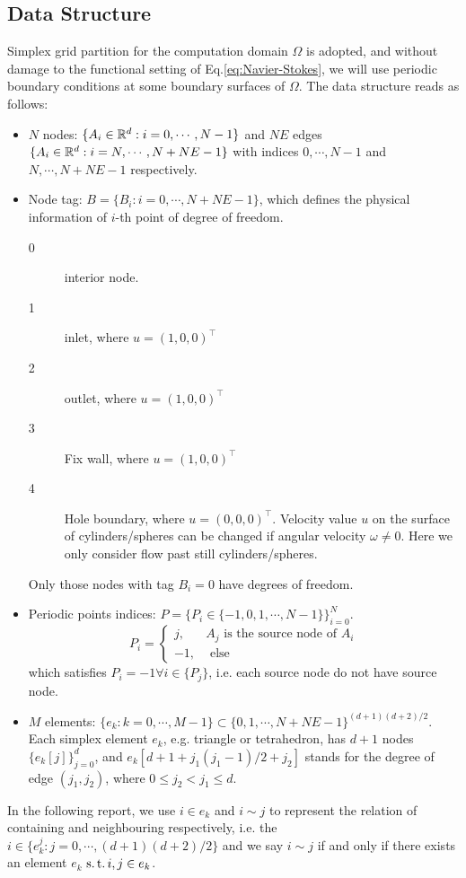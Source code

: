 \subsection{Data Structure}
Simplex grid partition for the computation domain $\Omega$ is adopted, 
and without damage to the functional setting of Eq.\eqref{eq:Navier-Stokes}, 
we will use periodic boundary conditions at some boundary surfaces of $\Omega$.
The data structure reads as follows:
\begin{itemize}
  \item $N$ nodes: $\{A_i\in\mathbb{R}^d:i=0,\cdots,N-1\}$ and 
    $NE$ edges $\{A_i\in\mathbb{R}^d:i=N,\cdots,N+NE-1\}$ 
    with indices $0,\cdots,N-1$ and $N,\cdots,N+NE-1$ respectively.

  \item Node tag: $B=\{B_i:i=0,\cdots,N+NE-1\}$, which defines the physical information of $i$-th point of degree of freedom.
    \begin{description}
      \item[0] interior node. 
      \item[1] inlet, where $u=(1,0,0)^\top$
      \item[2] outlet, where $u=(1,0,0)^\top$
      \item[3] Fix wall, where $u=(1,0,0)^\top$
      \item[4] Hole boundary, where $u=(0,0,0)^\top$. 
        Velocity value $u$ on the surface of cylinders/spheres can be changed 
        if angular velocity $\omega\neq0$. Here we only consider flow past still cylinders/spheres.
    \end{description}
    Only those nodes with tag $B_i=0$ have degrees of freedom.

  \item Periodic points indices: $P=\{P_i\in\{-1,0,1,\cdots,N-1\}\}_{i=0}^{N}$.
    \[
      P_i=\left\{\begin{array}{ll}
        j, & A_j \text{ is the source node of } A_i \\
        -1, & \text{ else }
      \end{array}\right.
      \]
    which satisfies $P_i=-1\forall i\in \{P_j\}$, 
    i.e. each source node do not have source node. 

  \item $M$ elements: $\{e_k:k=0,\cdots,M-1\}\subset\{0,1,\cdots,N+NE-1\}^{(d+1)(d+2)/2}$. 
    Each simplex element $e_k$, e.g. triangle or tetrahedron, 
    has $d+1$ nodes $\{e_k[j]\}_{j=0}^{d}$, 
    and $e_k[d+1+j_1(j_1-1)/2+j_2]$ stands for the degree of edge $(j_1,j_2)$, 
    where $0\leq j_2<j_1\leq d$.

\end{itemize}
In the following report, we use $i\in e_k$ and $i\sim j$ to represent the 
relation of containing and neighbouring respectively, i.e.
the $i\in\{e_k^j:j=0,\cdots,(d+1)(d+2)/2\}$ and 
we say $i\sim j$ if and only if there exists an element $e_k$ $\operatorname*{s.t.} i,j\in e_k$.

